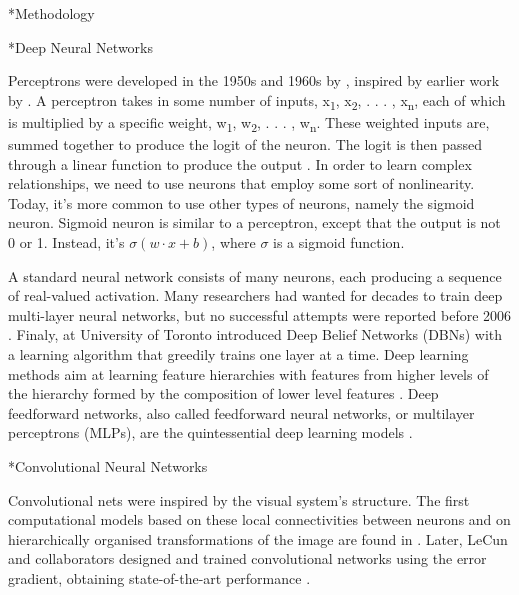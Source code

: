 \documentclass[twocolumn, a4paper,10pt]{article}
\makeatletter
\renewcommand\section{\@startsection{section}{1}{\z@}{0.25cm}{0.1cm}{\normalfont\large\bfseries}}
\renewcommand\subsection{\@startsection{subsection}{1}{\z@}{0.2cm}{0.1cm}{\normalfont\normalsize\bfseries}}
\renewcommand\subsubsection{\@startsection{subsection}{1}{\z@}{0.2cm}{0.1cm}{\normalfont\normalsize\itshape}}
\makeatother
\begin{document}
\section*{Methodology}

\subsection*{Deep Neural Networks}

Perceptrons were developed in the 1950s and 1960s by \cite{RN1279}, inspired by earlier work by \cite{RN1280}. A perceptron takes in some number of inputs, x\textsubscript{1}, x\textsubscript{2}, . . . , x\textsubscript{n}, each of which is multiplied by a specific weight, w\textsubscript{1}, w\textsubscript{2}, . . . , w\textsubscript{n}. These weighted inputs are, summed together to produce the logit of the neuron. The logit is then passed through a linear function to produce the output \citep{RN1281}. In order to learn complex relationships, we need to use neurons that employ some sort of nonlinearity. Today, it's more common to use other types of neurons, namely the sigmoid neuron. Sigmoid neuron is similar to a perceptron, except that the output is not 0 or 1. Instead, it's $\sigma(w⋅x+b)$, where $\sigma$ is a sigmoid function.

A standard neural network consists of many neurons, each producing a sequence of real-valued activation. Many researchers had wanted for decades to train deep multi-layer neural networks, but no successful attempts were reported before 2006 \citep{RN1284}. Finaly, \cite{RN1285} at University of Toronto introduced Deep Belief Networks (DBNs) with a learning algorithm that greedily trains one layer at a time. Deep learning methods aim at learning feature hierarchies with features from higher levels of the hierarchy formed by the composition of lower level features \citep{RN1284}. Deep feedforward networks, also called feedforward neural networks, or multilayer perceptrons (MLPs), are the quintessential deep learning models \citep{RN1282}.

\subsubsection*{Convolutional Neural Networks}

Convolutional nets were inspired by the visual system’s structure. The first computational models based on these local connectivities between neurons and on hierarchically organised transformations of the image are found in \cite{RN1286}. Later, LeCun and collaborators designed and trained convolutional networks using the error gradient, obtaining state-of-the-art performance \citep{RN1287}.
\end{document}
